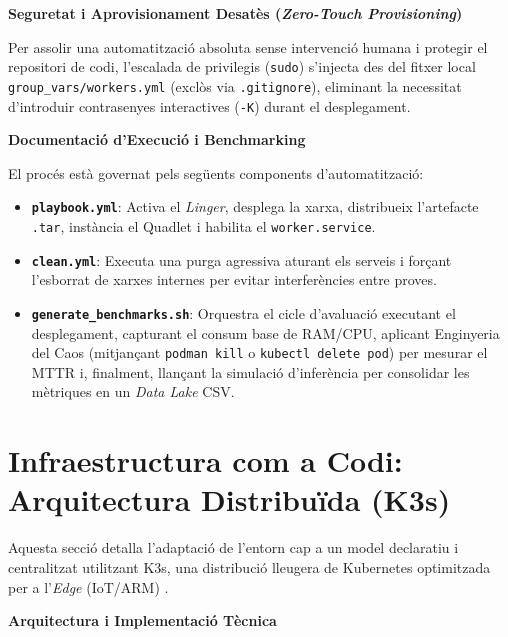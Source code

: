 \textbf{Seguretat i Aprovisionament Desatès (\textit{Zero-Touch Provisioning})}

Per assolir una automatització absoluta sense intervenció humana i protegir el repositori de codi, l'escalada de privilegis (\texttt{sudo}) s'injecta des del fitxer local \texttt{group\_vars/workers.yml} (exclòs via \texttt{.gitignore}), eliminant la necessitat d'introduir contrasenyes interactives (\texttt{-K}) durant el desplegament.

\textbf{Documentació d'Execució i Benchmarking}

El procés està governat pels següents components d'automatització:

\begin{itemize}
    \item \texttt{\textbf{playbook.yml}}: Activa el \textit{Linger}, desplega la xarxa, distribueix l'artefacte \texttt{.tar}, instància el Quadlet i habilita el \texttt{worker.service}.
    \item \texttt{\textbf{clean.yml}}: Executa una purga agressiva aturant els serveis i forçant l'esborrat de xarxes internes per evitar interferències entre proves.
    \item \texttt{\textbf{generate\_benchmarks.sh}}: Orquestra el cicle d'avaluació executant el desplegament, capturant el consum base de RAM/CPU, aplicant Enginyeria del Caos (mitjançant \texttt{podman kill} o \texttt{kubectl delete pod}) per mesurar el MTTR i, finalment, llançant la simulació d'inferència per consolidar les mètriques en un \textit{Data Lake} CSV.
\end{itemize}


\section{Infraestructura com a Codi: Arquitectura Distribuïda (K3s)}
Aquesta secció detalla l'adaptació de l'entorn cap a un model declaratiu i centralitzat utilitzant K3s, una distribució lleugera de Kubernetes optimitzada per a l'\textit{Edge} (IoT/ARM) \cite{k3s_docs}.

\textbf{Arquitectura i Implementació Tècnica}


